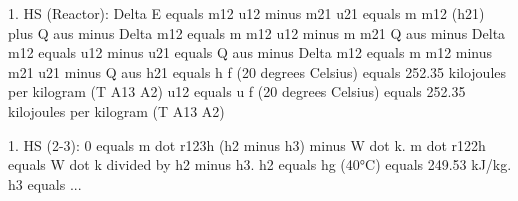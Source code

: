 1. HS (Reactor): Delta E equals m12 u12 minus m21 u21 equals m m12 (h21) plus Q aus
minus Delta m12 equals m m12 u12 minus m m21 Q aus
minus Delta m12 equals u12 minus u21 equals Q aus
minus Delta m12 equals m m12 minus m21 u21 minus Q aus
h21 equals h f (20 degrees Celsius) equals 252.35 kilojoules per kilogram (T A13 A2)
u12 equals u f (20 degrees Celsius) equals 252.35 kilojoules per kilogram (T A13 A2)

1. HS (2-3): 0 equals m dot r123h (h2 minus h3) minus W dot k. m dot r122h equals W dot k divided by h2 minus h3. h2 equals hg (40°C) equals 249.53 kJ/kg. h3 equals ...